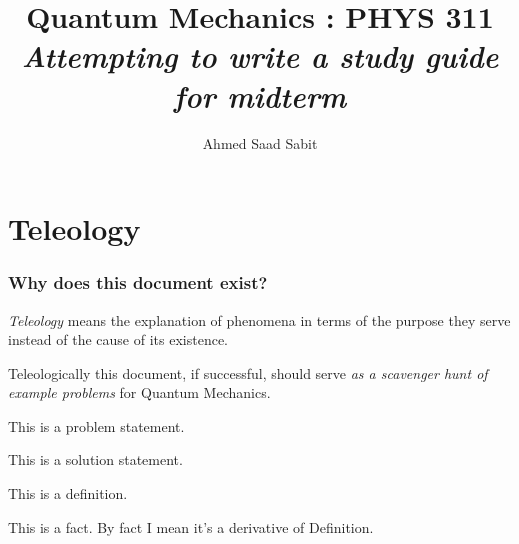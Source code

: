 \documentclass[10pt]{article}
\begin{document}
	\title{{Quantum Mechanics : PHYS 311}\\{\normalsize{\itshape 
Attempting to write a study guide for midterm
	}}}
	\author{Ahmed Saad Sabit}
	\maketitle
	\newpage
	\pagestyle{fancynotes}

\part{Teleology}
\section*{Why does this document exist?} 
\emph{Teleology} means the explanation of phenomena in terms of the purpose they serve instead of the cause of its existence.

Teleologically this document, if successful, should serve \emph{as a scavenger hunt of example problems} for Quantum Mechanics.


\begin{prob}
	This is a problem statement.
\end{prob}
\begin{solu}
	This is a solution statement. 
\end{solu}
\begin{definition}
	This is a definition. 
\end{definition}
\begin{fact}
This is a fact. By fact I mean it's a derivative of Definition.
\end{fact}
\end{document}

